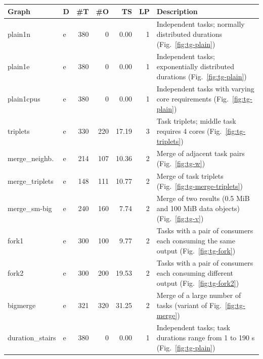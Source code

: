 \begin{table}[h]
    \centering
    \begin{tabular}{l|lrrrr|T}
        \toprule
        Graph            & D & \#T & \#O   & TS     & LP  & \normalsize{Description}     \\
        \midrule
        plain1n          & e & 380 & 0     & 0.00   & 1   & Independent tasks;
        normally distributed durations (Fig.~\ref{fig:tg-plain})                         \\
        plain1e          & e & 380 & 0     & 0.00   & 1   & Independent tasks;
        exponentially distributed durations (Fig.~\ref{fig:tg-plain})                    \\
        plain1cpus       & e & 380 & 0     & 0.00   & 1   & Independent tasks with
        varying core requirements (Fig.~\ref{fig:tg-plain})                              \\
        triplets         & e & 330 & 220   & 17.19  & 3   & Task triplets; middle
        task requires 4 cores (Fig.~\ref{fig:tg-triplets})                               \\
        merge\_neighb.   & e & 214 & 107   & 10.36  & 2   & Merge of adjacent
        task pairs (Fig.~\ref{fig:tg-w})                                                 \\
        merge\_triplets  & e & 148 & 111   & 10.77  & 2   & Merge of task
        triplets (Fig.~\ref{fig:tg-merge-triplets})                                      \\
        merge\_sm-big    & e & 240 & 160   & 7.74   & 2   & Merge of two
        results (0.5 MiB and 100 MiB data objects) (Fig.~\ref{fig:tg-v})                 \\
        fork1            & e & 300 & 100   & 9.77   & 2   & Tasks with a pair of
        consumers each consuming the same output (Fig.~\ref{fig:tg-fork})                \\
        fork2            & e & 300 & 200   & 19.53  & 2   & Tasks with a pair of
        consumers each consuming different output (Fig.~\ref{fig:tg-fork2})              \\
        bigmerge         & e & 321 & 320   & 31.25  & 2   & Merge of a large
        number of tasks (variant of Fig.~\ref{fig:tg-merge})                             \\
        duration\_stairs & e & 380 & 0     & 0.00   & 1   & Independent
        tasks; task durations range from 1 to 190 s (Fig.~\ref{fig:tg-plain})            \\

\end{tabular}
\end{table}
